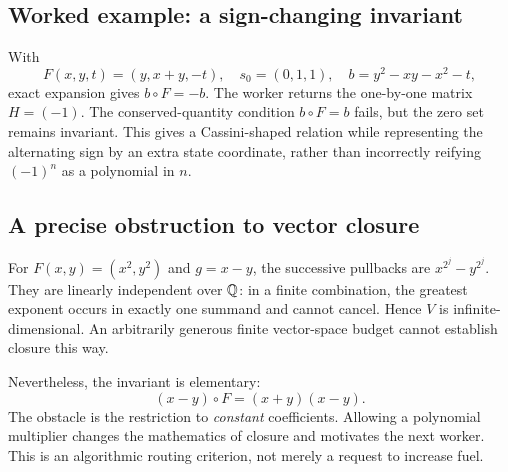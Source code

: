 \subsection{Worked example: a sign-changing invariant}

With
\[
 F(x,y,t)=(y,x+y,-t),\quad s_0=(0,1,1),\quad
 b=y^2-xy-x^2-t,
\]
exact expansion gives $b\circ F=-b$. The worker returns the one-by-one matrix $H=(-1)$. The conserved-quantity condition $b\circ F=b$ fails, but the zero set remains invariant. This gives a Cassini-shaped relation while representing the alternating sign by an extra state coordinate, rather than incorrectly reifying $(-1)^n$ as a polynomial in $n$.

\subsection{A precise obstruction to vector closure}

For $F(x,y)=(x^2,y^2)$ and $g=x-y$, the successive pullbacks are $x^{2^j}-y^{2^j}$. They are linearly independent over $\mathbb Q$: in a finite combination, the greatest exponent occurs in exactly one summand and cannot cancel. Hence $V$ is infinite-dimensional. An arbitrarily generous finite vector-space budget cannot establish closure this way.

Nevertheless, the invariant is elementary:
\[
 (x-y)\circ F=(x+y)(x-y).
\]
The obstacle is the restriction to \emph{constant} coefficients. Allowing a polynomial multiplier changes the mathematics of closure and motivates the next worker. This is an algorithmic routing criterion, not merely a request to increase fuel.
